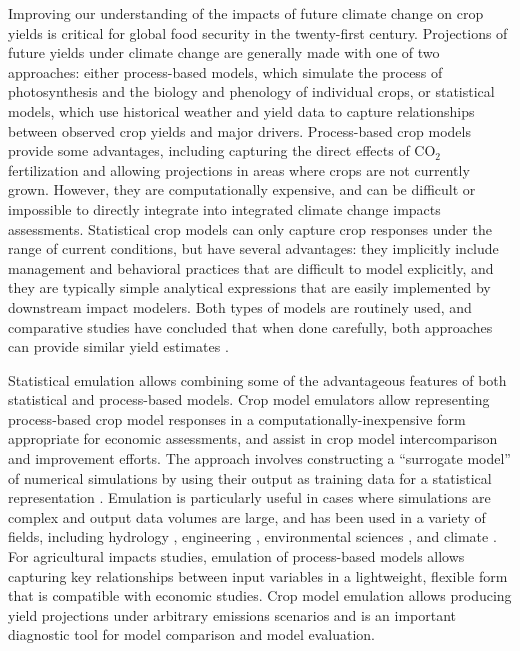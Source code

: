 \documentclass[gmd, manuscript]{copernicus} %
\begin{document}

\introduction
\label{S:1}
Improving our understanding of the impacts of future climate change on crop yields is critical for global food security in the twenty-first century. 
Projections of future yields under climate change are generally made with one of two approaches: either process-based models, which  simulate the process of photosynthesis and the biology and phenology of individual crops, or statistical models, which use historical weather and yield data to capture relationships between observed crop yields and major drivers.
Process-based crop models provide some advantages, including capturing the direct effects of CO$_2$ fertilization and allowing projections in areas where crops are not currently grown. 
However, they are computationally expensive, and can be difficult or impossible to directly integrate into integrated climate change impacts assessments.
Statistical crop models can only capture crop responses under the range of current conditions, but have several advantages: they implicitly include management and behavioral practices that are difficult to model explicitly, and they are typically simple analytical expressions that are easily implemented by downstream impact modelers. 
Both types of models are routinely used, and comparative studies have concluded that when done carefully, both approaches can provide similar yield estimates \citep[e.g.][]{Lobell2010, Moore2017, Roberts2017, zhao2017,liu2016similar}. 

Statistical emulation allows combining some of the advantageous features of both statistical and process-based models.
Crop model emulators allow representing process-based crop model responses in a computationally-inexpensive form appropriate for economic assessments, and assist in crop model intercomparison and improvement efforts.
The approach involves constructing a ``surrogate model'' of numerical simulations by using their output as training data for a statistical representation \citep[e.g.][]{OHAGAN2006, OHAGAN2010}. 
Emulation is particularly useful in cases where simulations are complex and output data volumes are large, and has been used in a variety of fields, including hydrology \citep[e.g.][]{Razavi2012}, engineering \citep[e.g.][]{STORLIE2009}, environmental sciences \citep[e.g.][]{RATTO2012}, and climate \citep[e.g.][]{Castruccio14, Holden2014}. 
For agricultural impacts studies, emulation of process-based models allows capturing key relationships between input variables in a lightweight, flexible form that is compatible with economic studies. 
Crop model emulation allows producing yield projections under arbitrary emissions scenarios and is an important diagnostic tool for model comparison and model evaluation.
\end{document}
